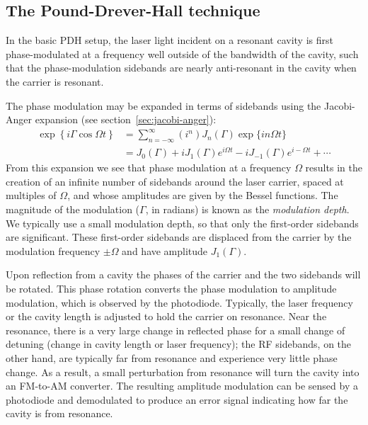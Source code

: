 \subsection{The Pound-Drever-Hall technique}
In the basic PDH setup, the laser light incident on a resonant cavity
is first phase-modulated at a frequency well outside of the bandwidth
of the cavity, such that the phase-modulation sidebands are nearly
anti-resonant in the cavity when the carrier is resonant.

The phase modulation may be expanded in terms of sidebands using the
Jacobi-Anger expansion (see section~\ref{sec:jacobi-anger}):
%
\begin{align}
\exp\left\{i\Gamma\cos\Omega t\right\} 
  &= \sum_{n=-\infty}^{\infty} \left(i^n\right)  J_n(\Gamma) \exp\{i n \Omega t\} \\
  &= J_0(\Gamma) + i J_{1}(\Gamma) e^{i\Omega t} - i J_{-1}(\Gamma) e^{i -\Omega t}+\cdots %
\end{align}
From this expansion we see that phase modulation at a frequency
$\Omega$ results in the creation of an infinite number of sidebands
around the laser carrier, spaced at multiples of $\Omega$, and whose
amplitudes are given by the Bessel functions.  The magnitude of the
modulation ($\Gamma$, in radians) is known as the \emph{modulation
depth}.  We typically use a small modulation depth, so that only the
first-order sidebands are significant.  These first-order sidebands
are displaced from the carrier by the modulation frequency $\pm\Omega$
and have amplitude $J_1(\Gamma)$.

Upon reflection from a cavity the phases of the carrier and the two
sidebands will be rotated.  This phase rotation converts the phase
modulation to amplitude modulation, which is observed by the
photodiode.  Typically, the laser frequency or the cavity length is
adjusted to hold the carrier on resonance.  Near the resonance, there
is a very large change in reflected phase for a small change of
detuning (change in cavity length or laser frequency); the RF
sidebands, on the other hand, are typically far from resonance and
experience very little phase change.  As a result, a small perturbation
from resonance will turn the cavity into an FM-to-AM converter.  The
resulting amplitude modulation can be sensed by a photodiode and
demodulated to produce an error signal indicating how far the cavity
is from resonance.

